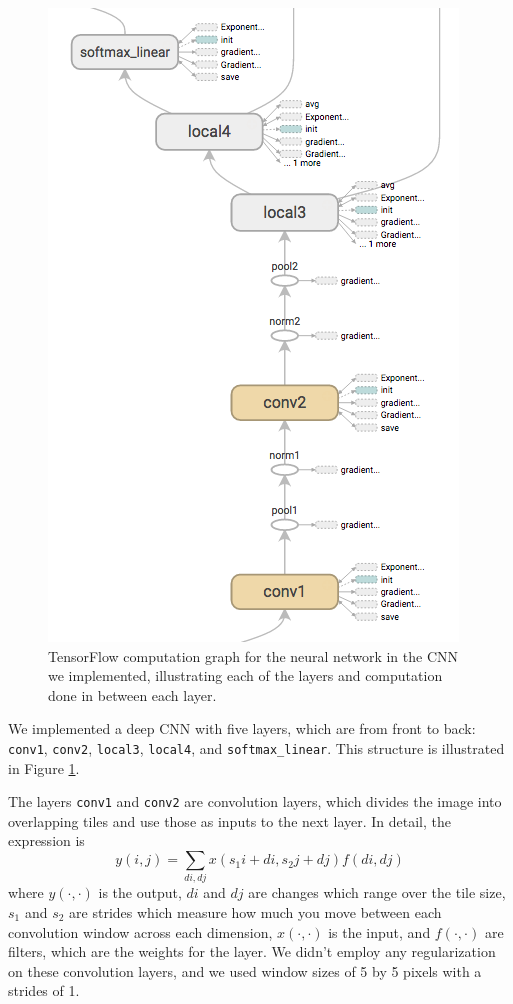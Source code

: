 \documentclass[10pt, twocolumn, twoside]{article}
\begin{document}
\begin{figure}[htb]
	\centering
	\includegraphics[width=\linewidth]{inference_graph}
	\caption{TensorFlow computation graph for the neural network in the CNN we implemented, illustrating each of the layers and computation done in between each layer.}
	\label{fig:inference}
\end{figure}

We implemented a deep CNN with five layers, which are from front to back: \texttt{conv1}, \texttt{conv2}, \texttt{local3}, \texttt{local4}, and \texttt{softmax\_linear}. This structure is illustrated in Figure \ref{fig:inference}. 

The layers \texttt{conv1} and \texttt{conv2} are convolution layers, which divides the image into overlapping tiles and use those as inputs to the next layer. In detail, the expression is
\[ y(i, j) = \sum_{di, dj} x(s_1i + di, s_2j + dj) f(di, dj)\]
where $y(\cdot, \cdot)$ is the output, $di$ and $dj$ are changes which range over the tile size, $s_1$ and $s_2$ are strides which measure how much you move between each convolution window across each dimension, $x(\cdot, \cdot)$ is the input, and $f(\cdot, \cdot)$ are filters, which are the weights for the layer. We didn't employ any regularization on these convolution layers, and we used window sizes of 5 by 5 pixels with a strides of 1.
\end{document}

